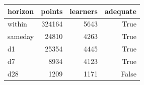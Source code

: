 \begin{tabular}{lrrr}
\toprule
horizon & points & learners & adequate \\
\midrule
within & 324164 & 5643 & True \\
sameday & 24810 & 4263 & True \\
d1 & 25354 & 4445 & True \\
d7 & 8934 & 4123 & True \\
d28 & 1209 & 1171 & False \\
\bottomrule
\end{tabular}
